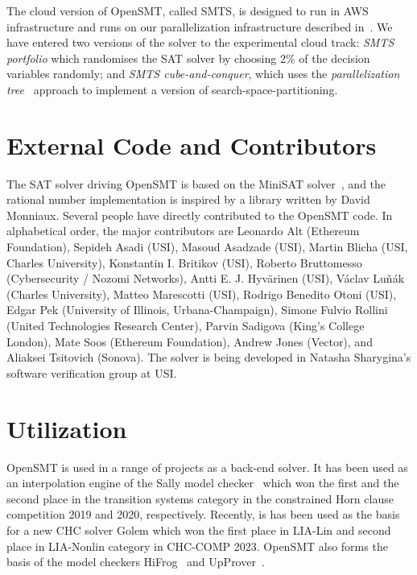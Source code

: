 \documentclass{easychair}
\begin{document}
The cloud version of OpenSMT, called SMTS, is designed to run in AWS
infrastructure and runs on our parallelization infrastructure described
in~\cite{MarescottiHS18}.
%
We have entered two versions of the solver to the experimental cloud
track: {\em SMTS portfolio} which randomises the SAT solver by choosing
2\% of the decision variables randomly; and {\em SMTS cube-and-conquer},
which uses the {\em parallelization tree}~\cite{HyvarinenMS:SAT15}
approach to implement a version of search-space-partitioning.

\section{External Code and Contributors}

The SAT solver driving OpenSMT is based on the MiniSAT
solver~\cite{EenS:SAT03}, and the rational number implementation is
inspired by a library written by David Monniaux.  Several people have
directly contributed to the OpenSMT code.  In alphabetical order, the
major contributors are
%
Leonardo Alt (Ethereum Foundation),
Sepideh Asadi (USI),
Masoud Asadzade (USI),
Martin Blicha (USI, Charles University),
Konstantin I. Britikov (USI),
Roberto Bruttomesso (Cybersecurity / Nozomi Networks),
Antti E. J. Hyv{\"a}rinen (USI),
V{\'a}clav Lu{\v n}{\'a}k (Charles University),
Matteo Marescotti (USI),
Rodrigo Benedito Otoni (USI),
Edgar Pek (University of Illinois, Urbana-Champaign),
Simone Fulvio Rollini (United Technologies Research Center),
Parvin Sadigova (King's College London),
Mate Soos (Ethereum Foundation),
Andrew Jones (Vector), and
Aliaksei Tsitovich (Sonova).
%
The solver is being developed in Natasha Sharygina's software
verification group at USI.

\section{Utilization}

OpenSMT is used in a range of projects as a back-end solver.  It has
been used as an interpolation engine of the Sally model
checker~\cite{JovanovicD:FMCAD16} which won the first and the second
place in the transition systems category in the constrained Horn clause
competition 2019 and 2020, respectively.  Recently, is has been used as
the basis for a new CHC solver Golem which won the first place in
 LIA-Lin and second place in LIA-Nonlin category in CHC-COMP 2023.  OpenSMT also forms the
basis of the model checkers HiFrog~\cite{AltACMFHS17} and
UpProver~\cite{Asadi_2020b}.
\end{document}
